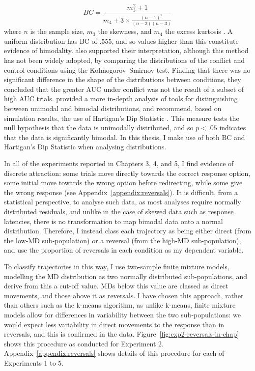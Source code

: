 \begin{equation}
  BC = \frac
  {m_3^2 + 1}
  {m_4 + 3 \times \frac{(n-1)^2}{(n-2)(n-3)}}
\end{equation}
where $n$ is the sample size, $m_3$ the skewness, and $m_4$ the excess kurtosis
\citep[see][]{Pfister2013,Freeman2012}.
A uniform distribution has BC of .555,
and so values higher than this constitute evidence of bimodality.
\citet{Spivey2005} also supported their interpretation,
although this method has not been widely adopted,
by comparing the distributions of the conflict and control conditions
using the Kolmogorov–Smirnov test.
Finding that there was no significant difference in
the shape of the distributions between conditions,
they concluded that the greater AUC under conflict
was not the result of a subset of high AUC trials.
\citet{Freeman2012} provided a more in-depth analysis of tools
for distinguishing between unimodal and bimodal distributions,
and recommend, based on simulation results, the use of
Hartigan's Dip Statistic \citep{Hartigan1985}.
This measure tests the null hypothesis that
the data is unimodally distributed,
and so $p < .05$ indicates that the data is significantly bimodal.
In this thesis, I make use of both BC
and Hartigan's Dip Statistic when analysing distributions.

In all of the experiments reported in Chapters 3, 4, and 5,
I find evidence of discrete attraction:
some trials move directly towards the correct response option,
some initial move towards the wrong option before redirecting,
while some give the wrong response (see Appendix~\ref{appendix:reversals}).
It is difficult, from a statistical perspective, to analyse such data,
as most analyses require normally distributed residuals,
and unlike in the case of skewed data such as response latencies,
there is no transformation to map bimodal data
onto a normal distribution.
Therefore, I instead class each trajectory
as being either direct (from the low-MD sub-population)
or a reversal (from the high-MD sub-population),
and use the proportion of reversals in each condition
as my dependent variable.

To classify trajectories in this way,
I use two-sample finite mixture models,
modelling the MD distribution as two normally distributed sub-populations,
and derive from this a cut-off value.
MDs below this value are classed as direct movements,
and those above it as reversals.
I have chosen this approach, rather than others such as the k-means algorithm,
as unlike k-means, finite mixture models allow for differences in variability
between the two sub-populations:
we would expect less variability in direct movements to the response
than in reversals, and this is confirmed in the data.
Figure~\ref{fig:exp2-reversals-in-chap} shows this procedure
as conducted for Experiment 2.
Appendix~\ref{appendix:reversals} shows details of this procedure
for each of Experiments 1 to 5.

